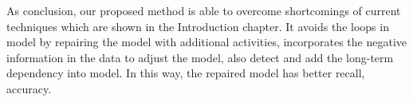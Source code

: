 \begin{table}[h]
	\centering
	\caption{Test Result on BPI15-M1 data}
	\label{tab:demo-result}
\end{table}

As conclusion, our proposed method is able to overcome shortcomings of current techniques which are shown in the Introduction chapter. It avoids the loops in model by repairing the model with additional activities, incorporates the negative information in the data to adjust the model, also detect and add the long-term dependency into model. In this way, the repaired model has better  recall, accuracy.

